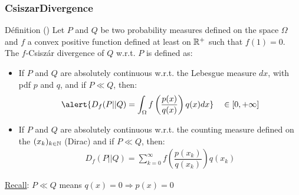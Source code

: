 \documentclass[8pt]{beamer}
\begin{document}
\begin{frame}
  \frametitle{CsiszarDivergence}
\small
  \begin{block}{D\'efinition}
(\cite{Csiszar1963})
    Let $P$ and $Q$ be two probability measures defined on the space $\Omega$ and  $f$ a  convex positive function defined at least on ${\mathbb R}^+$ such that $f(1)=0$.\\
    The $f$-Csisz\'ar divergence of $Q$ w.r.t. $P$ is defined as:
    \begin{itemize}
     \item If $P$ and $Q$ are absolutely continuous w.r.t. the Lebesgue measure $dx$, with pdf $p$ and $q$, and if $P  \ll Q$, then: 
    \begin{align}
     \alert{ D_f(P||Q)=\int_{\Omega}f\left(\dfrac{p(x)}{q(x)}\right)q(x)dx} \quad \in[0,+\infty]
    \end{align}
    \item If $P$ and $Q$ are absolutely continuous w.r.t. the counting measure defined on the $(x_k)_{k \in {\mathbb N}}$ (Dirac) and if $P  \ll Q$, then:
    \begin{align}
     \displaystyle D_f(P||Q)=\sum_{k=0}^{\infty}f\left(\dfrac{p(x_k)}{q(x_k)}\right)q(x_k)     
    \end{align}

    \end{itemize}
    
    
    \end{block}
    \underline{Recall}: $P  \ll Q$ means $q(x)= 0 \Longrightarrow p(x)=0$
\end{frame}
\end{document}
